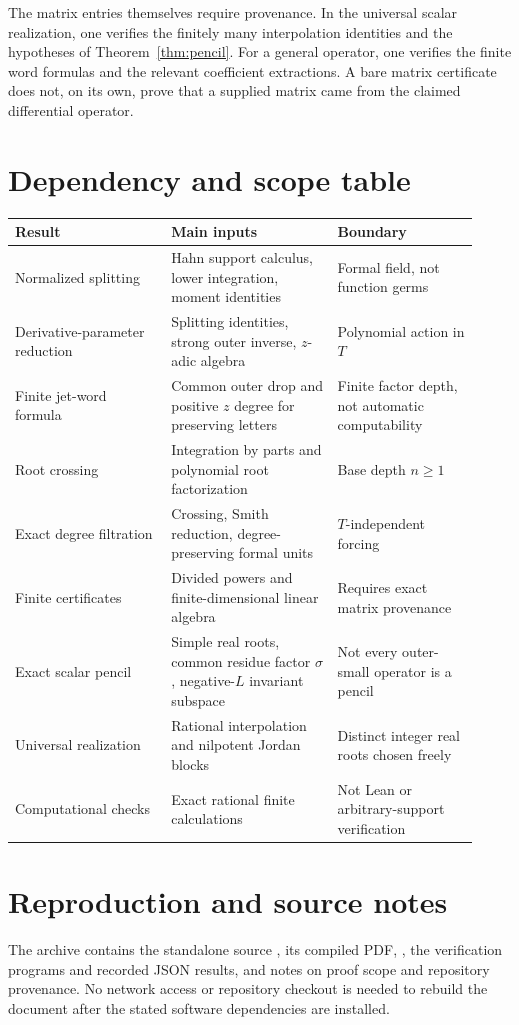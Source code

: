 \documentclass[11pt,a4paper]{article}
\numberwithin{equation}{section}
\theoremstyle{definition}
\theoremstyle{remark}
\theoremstyle{definition}
\begin{document}
The matrix entries themselves require provenance. In the universal scalar realization, one verifies the finitely many interpolation identities and the hypotheses of Theorem~\ref{thm:pencil}. For a general operator, one verifies the finite word formulas and the relevant coefficient extractions. A bare matrix certificate does not, on its own, prove that a supplied matrix came from the claimed differential operator.

\section{Dependency and scope table}
\begin{longtable}{>{\raggedright\arraybackslash}p{0.31\linewidth}>{\raggedright\arraybackslash}p{0.33\linewidth}>{\raggedright\arraybackslash}p{0.28\linewidth}}
\toprule
Result & Main inputs & Boundary\\
\midrule
\endhead
Normalized splitting & Hahn support calculus, lower integration, moment identities & Formal field, not function germs\\
Derivative-parameter reduction & Splitting identities, strong outer inverse, $z$-adic algebra & Polynomial action in $T$\\
Finite jet-word formula & Common outer drop and positive $z$ degree for preserving letters & Finite factor depth, not automatic computability\\
Root crossing & Integration by parts and polynomial root factorization & Base depth $n\ge1$\\
Exact degree filtration & Crossing, Smith reduction, degree-preserving formal units & $T$-independent forcing\\
Finite certificates & Divided powers and finite-dimensional linear algebra & Requires exact matrix provenance\\
Exact scalar pencil & Simple real roots, common residue factor $\sigma$, negative-$L$ invariant subspace & Not every outer-small operator is a pencil\\
Universal realization & Rational interpolation and nilpotent Jordan blocks & Distinct integer real roots chosen freely\\
Computational checks & Exact rational finite calculations & Not Lean or arbitrary-support verification\\
\bottomrule
\end{longtable}

\section{Reproduction and source notes}
The archive contains the standalone source , its compiled PDF, , the verification programs and recorded JSON results, and notes on proof scope and repository provenance. No network access or repository checkout is needed to rebuild the document after the stated software dependencies are installed.
\end{document}

